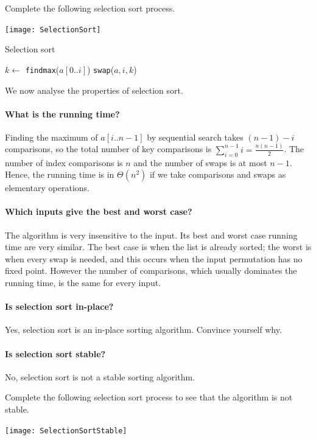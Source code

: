 \begin{Boxample}[0]
Complete the following selection sort process.
\begin{center}
\texttt{[image: SelectionSort]}
\end{center}
\end{Boxample}

\begin{algorithm}[H]
  \caption{Selection sort
    \label{alg:selsort}}
\begin{algorithmic}[1]
	\State $k \gets $ \texttt{findmax}($a[0..i]$)
		\State \texttt{swap}($a,i,k$)
	\EndIf
\EndFor
\State {}
\EndFunction
\end{algorithmic}
\end{algorithm}

We now analyse the properties of selection sort.

\paragraph{What is the running time?}
Finding the maximum of $a[i..n-1]$ by sequential search takes $(n-1) - i$ 
comparisons, so the total number of key comparisons is $\sum_{i=0}^{n-1} i  = \frac{n(n-1)}{2}$.
The number of index comparisons is $n$ and the number of swaps is at most $n - 1$.
Hence, the running time is in $\Theta(n^2)$ if we take comparisons and swaps as 
elementary operations.

\paragraph{Which inputs give the best and worst case?}
The algorithm is very insensitive to the input. 
Its best and worst case running time are very similar. 
The best case is when the list is already sorted; the worst is when every swap is needed, 
and this occurs when the input permutation has no fixed point. However the number of comparisons, which usually dominates the running time, 
is the same for every input.

\paragraph{Is selection sort in-place?}
Yes, selection sort is an in-place sorting algorithm. Convince yourself why.

\paragraph{Is selection sort stable?}
No, selection sort is not a stable sorting algorithm.
\begin{Boxample}[0]
Complete the following selection sort process to see that the algorithm is not stable.
\begin{center}
\texttt{[image: SelectionSortStable]} 
\end{center}
\end{Boxample}

